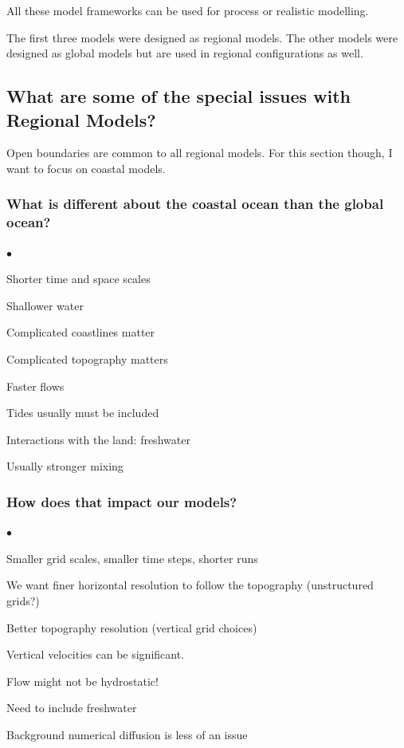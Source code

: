\documentclass[letterpaper,12pt]{article}
\newcounter{lnum}
\newenvironment{abbrevlist}%
  {\begin{list}{$\bullet$}{\setlength{\leftmargin}{2em}%
               \setlength{\itemindent}{0em}%
               \setlength{\itemsep}{0pt}%
               \setlength{\parsep}{0pt}%
               \setlength{\topsep}{2pt}%
               \usecounter{lnum} } }{\end{list}}
\begin{document}
All these model frameworks can be used for process or realistic modelling.

The first three models were designed as regional models. The other models were designed as global models but are used in regional configurations as well.

\subsection{What are some of the special issues with Regional Models?}

Open boundaries are common to all regional models.  For this section though, I want to focus on coastal models.

\subsubsection*{What is different about the coastal ocean than the global ocean?}

\begin{abbrevlist}
\item Shorter time and space scales
\item Shallower water
\item Complicated coastlines matter
\item Complicated topography matters
\item Faster flows
\item Tides usually must be included
\item Interactions with the land: freshwater
\item Usually stronger mixing
\end{abbrevlist} 

\subsubsection*{How does that impact our models?}

\begin{abbrevlist}
\item Smaller grid scales, smaller time steps, shorter runs
\item We want finer horizontal resolution to follow the topography (unstructured grids?)
\item Better topography resolution (vertical grid choices)
\item Vertical velocities can be significant.
\item Flow might not be hydrostatic!
\item Need to include freshwater
\item Background numerical diffusion is less of an issue
\end{abbrevlist}
\end{document}
